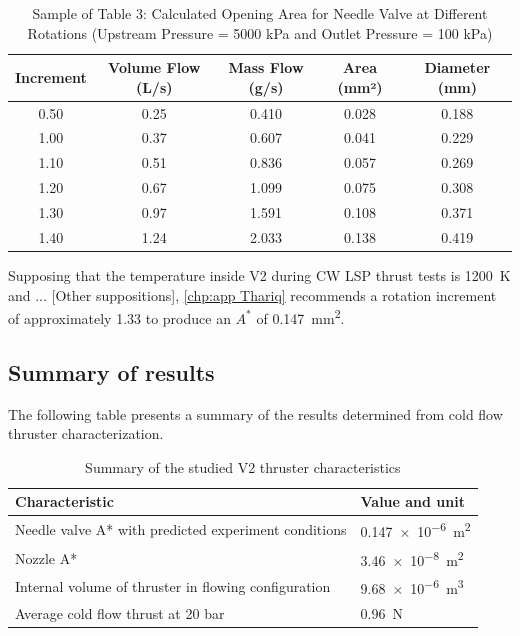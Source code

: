             \begin{table}[!ht]
                \centering
                \caption{Sample of Table 3: Calculated Opening Area for Needle Valve at Different Rotations (Upstream Pressure = 5000 kPa and Outlet Pressure = 100 kPa)}
                \label{tab:opening_area}
                \begin{tabular}{|c|c|c|c|c|}
                \hline
                \textbf{Increment} & \textbf{Volume Flow (L/s)} & \textbf{Mass Flow (g/s)} & \textbf{Area (mm²)} & \textbf{Diameter (mm)} \\ \hline
                0.50 & 0.25 & 0.410 & 0.028 & 0.188 \\ \hline
                1.00 & 0.37 & 0.607 & 0.041 & 0.229 \\ \hline
                1.10 & 0.51 & 0.836 & 0.057 & 0.269 \\ \hline
                1.20 & 0.67 & 1.099 & 0.075 & 0.308 \\ \hline
                1.30 & 0.97 & 1.591 & 0.108 & 0.371 \\ \hline
                1.40 & 1.24 & 2.033 & 0.138 & 0.419 \\ \hline
                \end{tabular}
            \end{table}

            Supposing that the temperature inside V2 during CW LSP thrust tests is \qty{1200}{K} and ... [Other suppositions], \autoref{chp:app Thariq} recommends a rotation increment of approximately 1.33 to produce an $A^*$ of \qty{0.147}{mm^2}. 

        \subsection{Summary of results}

            The following table presents a summary of the results determined from cold flow thruster characterization.

            \begin{table}[!ht]
                \centering
                \caption{Summary of the studied V2 thruster characteristics}
                \label{tab:characteristics}
                \begin{tabularx}{\textwidth}{XX}
                \toprule
                Characteristic                                          &     Value and unit          \\ \midrule
                Needle valve A* with predicted experiment conditions   &     \qty{0.147e-6}{m^2}     \\
                Nozzle A*                                               &     \qty{3.46e-8}{m^2}      \\
                Internal volume of thruster in flowing configuration    &     \qty{9.68e-6}{m^3}      \\
                Average cold flow thrust at 20 bar                      &     \qty{0.96}{N}           \\
                \bottomrule 
                \end{tabularx}
            \end{table}

